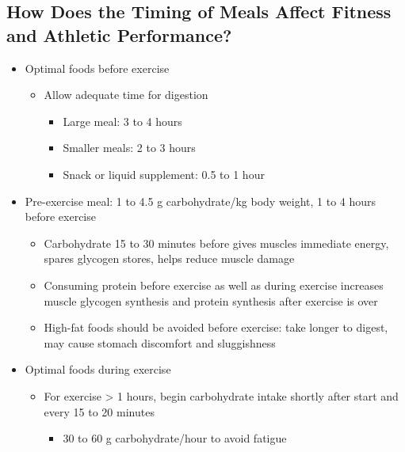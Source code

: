 \documentclass[12pt]{article}
\begin{document}
        \subsection{How Does the Timing of Meals Affect Fitness and Athletic Performance?}
            \begin{itemize}
                \item Optimal foods before exercise
                    \begin{itemize}
                        \item Allow adequate time for digestion
                            \begin{itemize}
                                \item Large meal: 3 to 4 hours
                                \item Smaller meals: 2 to 3 hours
                                \item Snack or liquid supplement: 0.5 to 1 hour
                            \end{itemize}
                    \end{itemize}
                \item Pre-exercise meal: 1 to 4.5 g carbohydrate/kg body weight, 1 to 4 hours before exercise
                    \begin{itemize}
                        \item Carbohydrate 15 to 30 minutes before gives muscles immediate energy, spares glycogen stores, helps reduce muscle damage
                        \item Consuming protein before exercise as well as during exercise increases muscle glycogen synthesis and protein synthesis after exercise is over
                        \item High-fat foods should be avoided before exercise: take longer to digest, may cause stomach discomfort and sluggishness
                    \end{itemize}
                \item Optimal foods during exercise
                    \begin{itemize}
                        \item For exercise > 1 hours, begin carbohydrate intake shortly after start and every 15 to 20 minutes
                            \begin{itemize}
                                \item 30 to 60 g carbohydrate/hour to avoid fatigue
                            \end{itemize}

\end{itemize}
\end{itemize}
\end{document}
